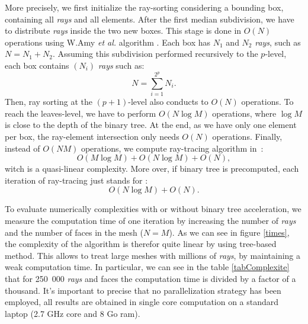 \documentclass[AMA,STIX1COL]{WileyNJD-v2}
\begin{document}
More precisely, we first initialize the ray-sorting considering a bounding box, containing all \textit{rays} and all elements. After the first median subdivision, we have to distribute \textit{rays} inside the two new boxes. This stage is done in $O(N)$ operations using W.Amy \textit{et al.} algorithm \cite{AABB}. Each box has $N_1$ and $N_2$ \textit{rays}, such as $N = N_1 + N_2$. Assuming this subdivision performed recursively to the $p$-level, each box contains $(N_i)$ \textit{rays} such as: 
\begin{equation}
N = \sum_{i=1}^{2^p} N_i.
\end{equation}  
Then, ray sorting at the $(p+1)$-level also conducts to $O(N)$ operations. To reach the leaves-level, we have to perform $O(N \log M)$ operations, where $\log M$ is close to the depth of the binary tree. At the end, as we have only one element per box, the ray-element intersection only needs $O(N)$ operations. Finally, instead of $O(N M)$ operations, we compute ray-tracing algorithm in~: 
\begin{equation}
O(M\log M) + O(N \log M) + O(N),
\end{equation}  
witch is a quasi-linear complexity. More over, if binary tree is precomputed, each iteration of ray-tracing just stands for :
\begin{equation}
O(N \log M) + O(N).
\end{equation}
 
To evaluate numerically complexities with or without binary tree acceleration, we measure the computation time of one iteration by increasing the number of \textit{rays} and the number of faces in the mesh ($N=M$). As we can see in figure \ref{times}, the complexity of the algorithm is therefor quite linear by using tree-based method. This allows to treat large meshes with millions of \textit{rays}, by maintaining a weak computation time. In particular, we can see in the table \ref{tabComplexite} that for 250~000 \textit{rays} and faces the computation time is divided by a factor of a thousand. It's important to precise that no parallelization strategy has been employed, all results are obtained in single core computation on a standard laptop (2.7 GHz core and 8 Go ram).
\end{document}

